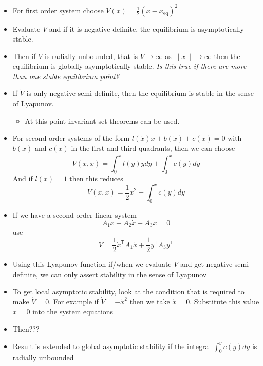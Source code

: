 \begin{itemize}
  \item{For first order system choose $V(x)=\frac{1}{2}(x-x_{\text{eq}})^{2}$}
  \item{Evaluate $\dot{V}$ and if it is negative definite, the equilibrium is asymptotically stable.}
  \item{Then if $V$ is radially unbounded, that is $V\rightarrow\infty$ as $\|x\|\rightarrow\infty$ then the equilibrium is globally asymptotically stable.
  \textit{Is this true if there are more than one stable equilibrium point?}}
  \item{If $\dot{V}$ is only negative semi-definite, then the equilibrium is stable in the sense of Lyapunov.}
  \begin{itemize}
    \item{At this point invariant set theorems can be used.}
  \end{itemize}
  \item{For second order systems of the form $l(\dot{x})\ddot{x}+b(\dot{x})+c(x)=0$ with $b(\dot{x})$ and $c(x)$ in the first and third quadrants, then we can choose}
  \begin{equation*}
    V(x,\dot{x})=\int_{0}^{\dot{x}}l(y)ydy+\int_{0}^{x}c(y)dy
  \end{equation*}
  And if $l(\dot{x})=1$ then this reduces
  \begin{equation*}
    V(x,\dot{x})=\frac{1}{2}\dot{x}^{2}+\int_{0}^{x}c(y)dy
  \end{equation*}
  \item{If we have a second order linear system}
  \begin{equation*}
    A_{1}\ddot{x}+A_{2}\dot{x}+A_{3}x=0
  \end{equation*}
  use
  \begin{equation*}
    V=\frac{1}{2}\dot{x}^{\mathsf{T}}A_{1}\dot{x}+\frac{1}{2}y^{\mathsf{T}}A_{3}y^{\mathsf{T}}
  \end{equation*}
  \item{Using this Lyapunov function if/when we evaluate $\dot{V}$ and get negative semi-definite, we can only assert stability in the sense of Lyapunov}
  \item{To get local asymptotic stability, look at the condition that is required to make $\dot{V}=0$.
  For example if $\dot{V}=-\dot{x}^{2}$ then we take $\dot{x}=0$.
  Substitute this value $\dot{x}=0$ into the system equations}
  \item{Then???}
  \item{Result is extended to global asymptotic stability if the integral $\int_{0}^{y}c(y)dy$ is radially unbounded}
\end{itemize}


